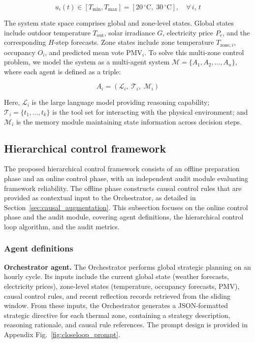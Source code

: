 \documentclass[a4paper]{cas-sc}
\begin{document}
\begin{equation}
u_i(t) \in [T_{\min}, T_{\max}] = [20\,^{\circ}\text{C},\; 30\,^{\circ}\text{C}], \quad \forall\, i,\, t
\label{eq:constraint}
\end{equation}

The system state space comprises global and zone-level states. Global states include outdoor temperature $T_{\text{out}}$, solar irradiance $G$, electricity price $P_e$, and the corresponding $H$-step forecasts. Zone states include zone temperature $T_{\text{zone},i}$, occupancy $O_i$, and predicted mean vote $\text{PMV}_i$. To solve this multi-zone control problem, we model the system as a multi-agent system $\mathcal{M} = \{A_1, A_2, \ldots, A_n\}$, where each agent is defined as a triple:

\begin{equation}
A_i = (\mathcal{L}_i,\; \mathcal{T}_i,\; \mathcal{M}_i)
\label{eq:agent}
\end{equation}

\noindent Here, $\mathcal{L}_i$ is the large language model providing reasoning capability; $\mathcal{T}_i = \{t_1, \ldots, t_k\}$ is the tool set for interacting with the physical environment; and $\mathcal{M}_i$ is the memory module maintaining state information across decision steps.

\subsection{Hierarchical control framework}
\label{sec:hierarchical_framework}

The proposed hierarchical control framework consists of an offline preparation phase and an online control phase, with an independent audit module evaluating framework reliability. The offline phase constructs causal control rules that are provided as contextual input to the Orchestrator, as detailed in Section~\ref{sec:causal_augmentation}. This subsection focuses on the online control phase and the audit module, covering agent definitions, the hierarchical control loop algorithm, and the audit metrics.

\subsubsection{Agent definitions}

\textbf{Orchestrator agent.}
The Orchestrator performs global strategic planning on an hourly cycle. Its inputs include the current global state (weather forecasts, electricity prices), zone-level states (temperature, occupancy forecasts, PMV), causal control rules, and recent reflection records retrieved from the sliding window. From these inputs, the Orchestrator generates a JSON-formatted strategic directive for each thermal zone, containing a strategy description, reasoning rationale, and causal rule references. The prompt design is provided in Appendix Fig.~\ref{fig:closeloop_prompt}.
\end{document}
